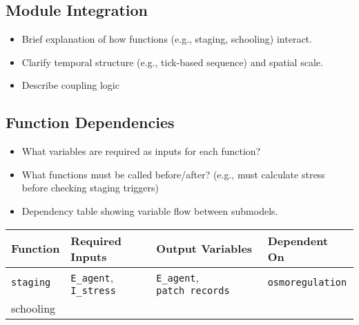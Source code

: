 \documentclass[
]{book}
\providecommand{\tightlist}{%
  \setlength{\itemsep}{0pt}\setlength{\parskip}{0pt}}
\begin{document}
\subsection{Module Integration}\label{module-integration}

\begin{itemize}
\tightlist
\item
  Brief explanation of how functions (e.g., staging, schooling) interact.
\item
  Clarify temporal structure (e.g., tick-based sequence) and spatial scale.
\item
  Describe coupling logic
\end{itemize}

\subsection{Function Dependencies}\label{function-dependencies}

\begin{itemize}
\item
  What variables are required as inputs for each function?
\item
  What functions must be called before/after? (e.g., must calculate stress before checking staging triggers)
\item
  Dependency table showing variable flow between submodels.
\end{itemize}

\begin{longtable}[]{@{}
  >{\raggedright\arraybackslash}p{}
  >{\raggedright\arraybackslash}p{}
  >{\raggedright\arraybackslash}p{}
  >{\raggedright\arraybackslash}p{}@{}}
\toprule\noalign{}
\begin{minipage}[b]{\linewidth}\raggedright
Function
\end{minipage} & \begin{minipage}[b]{\linewidth}\raggedright
Required Inputs
\end{minipage} & \begin{minipage}[b]{\linewidth}\raggedright
Output Variables
\end{minipage} & \begin{minipage}[b]{\linewidth}\raggedright
Dependent On
\end{minipage} \\
\midrule\noalign{}
\endhead
\bottomrule\noalign{}
\endlastfoot
\texttt{staging} & \texttt{E\_agent}, \texttt{I\_stress} & \texttt{E\_agent}, \texttt{patch\ records} & \texttt{osmoregulation} \\
schooling & & & \\
\end{longtable}
\end{document}
